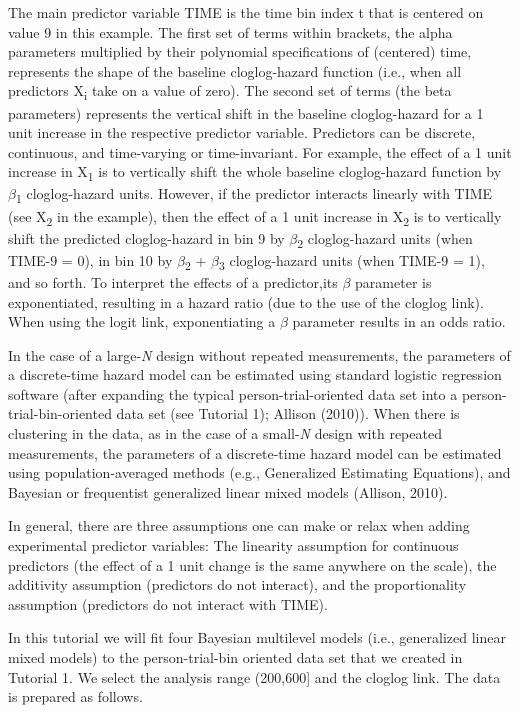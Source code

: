 \documentclass[
  man,floatsintext]{apa6}
\begin{document}
The main predictor variable TIME is the time bin index t that is centered on value 9 in this example. The first set of terms within brackets, the alpha parameters multiplied by their polynomial specifications of (centered) time, represents the shape of the baseline cloglog-hazard function (i.e., when all predictors X\textsubscript{i} take on a value of zero). The second set of terms (the beta parameters) represents the vertical shift in the baseline cloglog-hazard for a 1 unit increase in the respective predictor variable. Predictors can be discrete, continuous, and time-varying or time-invariant. For example, the effect of a 1 unit increase in X\textsubscript{1} is to vertically shift the whole baseline cloglog-hazard function by \(\beta\)\textsubscript{1} cloglog-hazard units. However, if the predictor interacts linearly with TIME (see X\textsubscript{2} in the example), then the effect of a 1 unit increase in X\textsubscript{2} is to vertically shift the predicted cloglog-hazard in bin 9 by \(\beta\)\textsubscript{2} cloglog-hazard units (when TIME-9 = 0), in bin 10 by \(\beta\)\textsubscript{2} + \(\beta\)\textsubscript{3} cloglog-hazard units (when TIME-9 = 1), and so forth. To interpret the effects of a predictor,its \(\beta\) parameter is exponentiated, resulting in a hazard ratio (due to the use of the cloglog link). When using the logit link, exponentiating a \(\beta\) parameter results in an odds ratio.

In the case of a large-\emph{N} design without repeated measurements, the parameters of a discrete-time hazard model can be estimated using standard logistic regression software (after expanding the typical person-trial-oriented data set into a person-trial-bin-oriented data set (see Tutorial 1); Allison (2010)). When there is clustering in the data, as in the case of a small-\emph{N} design with repeated measurements, the parameters of a discrete-time hazard model can be estimated using population-averaged methods (e.g., Generalized Estimating Equations), and Bayesian or frequentist generalized linear mixed models (Allison, 2010).

In general, there are three assumptions one can make or relax when adding experimental predictor variables: The linearity assumption for continuous predictors (the effect of a 1 unit change is the same anywhere on the scale), the additivity assumption (predictors do not interact), and the proportionality assumption (predictors do not interact with TIME).

In this tutorial we will fit four Bayesian multilevel models (i.e., generalized linear mixed models) to the person-trial-bin oriented data set that we created in Tutorial 1. We select the analysis range (200,600{]} and the cloglog link. The data is prepared as follows.
\end{document}
